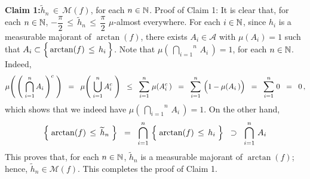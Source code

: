 \vskip 0.8cm
\noindent
\textbf{Claim 1:}\quad $\widetilde{h}_{n} \,\in\, \mathcal{M}(f)$, for each $n \in \mathbb{N}$.
\vskip 0.1cm
\noindent
Proof of Claim 1:\;\;
It is clear that, for each $n \in \mathbb{N}$, $-\dfrac{\pi}{2} \,\leq\, \widetilde{h}_{n} \,\leq\, \dfrac{\pi}{2}$ $\mu$-almost everywhere.
For each $i \in \mathbb{N}$, since $h_{i}$ is a measurable majorant of $\arctan(f)$,
there exists $A_{i} \in \mathcal{A}$ with $\mu(A_{i}) = 1$
such that $A_{i} \subset \left\{\, \arctan(f) \,\overset{{\color{white}.}}{\leq}\, h_{i} \,\right\}$.
Note that $\mu\!\left(\,\overset{n}{\underset{i=1}{\bigcap}}\,A_{i}\,\right) = 1$, for each $n \in \mathbb{N}$.
Indeed,
\begin{equation*}
\mu\!\left(\,\left(\;\overset{n}{\underset{i=1}{\bigcap}}\,A_{i}\,\right)^{c}\;\right)
\;\; = \;\;
	\mu\!\left(\;\overset{n}{\underset{i=1}{\bigcup}}\,A_{i}^{c}\;\right)
\;\; \leq \;\;
	\overset{n}{\underset{i=1}{\sum}}\;\mu\!\left(A_{i}^{c}\,\right)
\;\; = \;\;
	\overset{n}{\underset{i=1}{\sum}}\,\left(1 \overset{{\color{white}.}}{-} \mu\!\left(A_{i}\,\right)\right)
\;\; = \;\;
	\overset{n}{\underset{i=1}{\sum}}\;0
\;\; = \;\;
	0\,,
\end{equation*}
which shows that we indeed have $\mu\!\left(\,\overset{n}{\underset{i=1}{\bigcap}}\,A_{i}\,\right) = 1$.
On the other hand,
\begin{equation*}
\left\{\;\arctan(f) \,\leq\, \widetilde{h}_{n}\;\right\}
\;\; = \;\;
	\bigcap_{i=1}^{n}\,\left\{\;\arctan(f) \,\overset{{\color{white}.}}{\leq}\, h_{i}\;\right\}
\;\; \supset \;\;
	\bigcap_{i=1}^{n}\,A_{i}
\end{equation*}
This proves that, for each $n \in \mathbb{N}$, $\widetilde{h}_{n}$ is a measurable majorant of $\arctan(f)$;
hence, $\widetilde{h}_{n} \in \mathcal{M}(f)$. This completes the proof of Claim 1.


